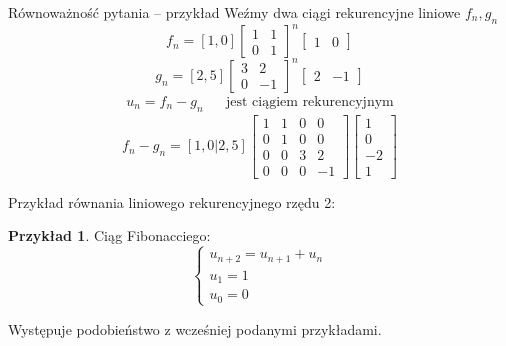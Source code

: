 \documentclass[handout]{beamer}
\theoremstyle{definition}
\newtheorem*{przyklad}{Przykład}
\theoremstyle{named}
\begin{document}
\begin{frame}{Równoważność pytania -- przykład}
Weźmy dwa ciągi rekurencyjne liniowe $f_n, g_n$
    \begin{equation*}
        f_{n} = [1,0] \begin{bmatrix}
            1 & 1 \\
            0 & 1 
        \end{bmatrix}^{n}
        \begin{bmatrix}
            1 & 0
        \end{bmatrix}
    \end{equation*}
    \pause
    \begin{equation*}
         g_{n} = [2,5] \begin{bmatrix}
            3 & 2 \\
            0 & -1 
        \end{bmatrix}^{n}
        \begin{bmatrix}
            2 & -1
        \end{bmatrix}
    \end{equation*}
    \pause
    \begin{align*}
        u_n = f_n - g_n && \text{jest ciągiem rekurencyjnym} 
    \end{align*}
    \pause
    $$
        f_n - g_n = [1,0|2,5] 
        \left[
        \begin{array}{cc|cc}
        1 & 1 & 0 & 0 \\
        0 & 1 & 0 & 0 \\
        \hline
        0 & 0 & 3 & 2 \\
        0 & 0 & 0 & -1
        \end{array}
        \right]
        \begin{bmatrix}
            1  \\
            0  \\
            \hline
            -2 \\
            1 
        \end{bmatrix}
    $$
    
\end{frame}


\begin{frame}
    Przykład równania liniowego rekurencyjnego rzędu 2:
    \begin{przyklad}

    Ciąg Fibonacciego:
   \begin{equation*}
        \begin{cases}
        u_{n+2} = u_{n+1} + u_n \\
        u_{1} = 1 \\
        u_{0} = 0
        \end{cases}
    \end{equation*}
            
    \end{przyklad}
    
    Występuje podobieństwo z wcześniej podanymi przykładami. 

\end{frame}
\end{document}
